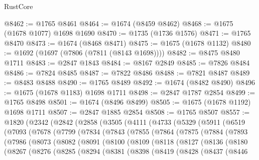 \begin{lexlean}{RustCore}
\begin{coremodule}
@8462 := @1765 @8461
@8464 := @1674 (@8459 @8462)
@8468 := @1675 (@1678 @1077) @1698 @1690
@8470 := @1735 (@1736 @1576)
@8471 := @1765 @8470
@8473 := @1674 (@8468 @8471)
@8475 := @1675 (@1678 @1132)
@8480 := @1692 (@1697 (@7806 (@7811 (@8143 @1698))))
@8482 := @8475 @8480 @1711
@8483 := @2847 @1843
@8484 := @8167 @2849
@8485 := @7826 @8484
@8486 := @7824 @8485
@8487 := @7822 @8486
@8488 := @7821 @8487
@8489 := @8483 @8488
@8490 := @1765 @8489
@8492 := @1674 (@8482 @8490)
@8496 := @1675 (@1678 @1183) @1698 @1711
@8498 := @2847 @1787 @2854
@8499 := @1765 @8498
@8501 := @1674 (@8496 @8499)
@8505 := @1675 (@1678 @1192) @1698 @1711
@8507 := @2847 @1885 @2854
@8508 := @1765 @8507
@8557 := @1820
    (@2342
      (@2842
        (@2858
          (@3505
            (@4111
              (@4733
                (@5329
                  (@5911
                    (@6519
                      (@7093
                        (@7678
                          (@7799
                            (@7834
                              (@7843
                                (@7855
                                  (@7864
                                    (@7875
                                      (@7884
                                        (@7893
                                          (@7986
                                            (@8073
                                              (@8082
                                                (@8091
                                                  (@8100
                                                    (@8109
                                                      (@8118
                                                        (@8127
                                                          (@8136
                                                            (@8180
                                                              (@8267
                                                                (@8276
                                                                  (@8285
                                                                    (@8294
                                                                      (@8381
                                                                        (@8398
                                                                          (@8419
                                                                            (@8428
                                                                              (@8437
                                                                                (@8446

\end{coremodule}
\end{lexlean}
